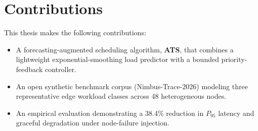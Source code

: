 \section{Contributions}

This thesis makes the following contributions:

\begin{itemize}
  \item A forecasting-augmented scheduling algorithm, \textbf{ATS}, that combines
        a lightweight exponential-smoothing load predictor with a bounded
        priority-feedback controller.
  \item An open synthetic benchmark corpus (Nimbus-Trace-2026) modeling three
        representative edge workload classes across 48 heterogeneous nodes.
  \item An empirical evaluation demonstrating a 38.4\% reduction in $P_{95}$
        latency and graceful degradation under node-failure injection.
\end{itemize}
